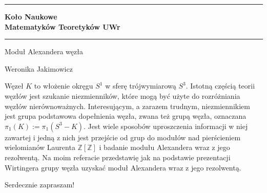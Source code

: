 \documentclass[a4paper,12pt]{article}
\begin{document}
\hrule
\vspace*{3ex}
\begin{minipage}{0.25\textwidth}
\begin{flushleft}

\end{flushleft}
\end{minipage}
\begin{minipage}{0.7\textwidth}
\Large{\bf Koło Naukowe \\ Matematyków Teoretyków UWr}
\end{minipage}
\vspace*{5ex}
\hrule

\vspace*{5ex}

\vspace*{5ex}

\begin{center}
\LARGE{\sc Moduł Alexandera węzła}
\end{center}
\begin{center}
\large{Weronika Jakimowicz} \\  
\end{center}

\vspace*{8ex}

Węzeł $K$ to włożenie okręgu $S^1$ w sferę trójwymiarową $S^3$. Istotną częścią teorii węzłów jest szukanie niezmienników, które mogą być użyte do rozróżniania węzłów nierównoważnych. 
Interesującym, a zarazem trudnym, niezmiennikiem jest grupa podstawowa dopełnienia węzła, zwana też grupą węzła, oznaczana $\pi_1(K):=\pi_1(S^3-K)$. Jest wiele sposobów uproszczenia informacji w niej zawartej i jedną z nich jest przejście od grup do modułów nad pierścieniem wielomianów Laurenta $\mathbb{Z}[\mathbb{Z}]$ i badanie modułu Alexandera wraz z jego rezolwentą. Na moim referacie przedstawię jak na podstawie prezentacji Wirtingera grupy węzła uzyskać moduł Alexandera wraz z jego rezolwentą.


\vspace*{5ex}
\begin{flushright}
\large{\sc Serdecznie zapraszam!}
\end{flushright}
\end{document}
